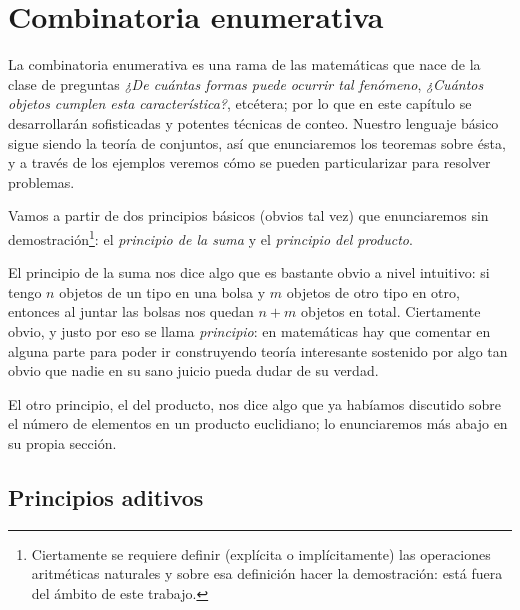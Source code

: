 \documentclass{book}
\theoremstyle{definition}
\begin{document}






\chapter{Combinatoria enumerativa}
\label{ch_combinatoriaEnumerativa}
La combinatoria enumerativa es una rama de las matemáticas que nace de la clase de preguntas \emph{¿De cuántas formas puede ocurrir tal fenómeno}, \emph{¿Cuántos objetos cumplen esta característica?}, etcétera; por lo que en este capítulo se desarrollarán  sofisticadas y potentes técnicas de conteo. Nuestro lenguaje básico sigue siendo la teoría de conjuntos, así que enunciaremos los teoremas sobre ésta, y a través de los ejemplos veremos cómo se pueden particularizar para resolver problemas.

Vamos a partir de dos principios básicos (obvios tal vez) que enunciaremos sin demostración\footnote{Ciertamente se requiere definir (explícita o implícitamente) las operaciones aritméticas naturales y sobre esa definición hacer la demostración: está fuera del ámbito de este trabajo.}: el \emph{principio de la suma} y el \emph{principio del producto}.

El principio de la suma nos dice algo que es bastante obvio a nivel intuitivo: si tengo $n$ objetos de un tipo en una bolsa y $m$ objetos de otro tipo en otro, entonces al juntar las bolsas nos quedan $n+m$ objetos en total.
Ciertamente obvio, y justo por eso se llama \emph{principio}: en matemáticas hay que comentar en alguna parte para poder ir construyendo teoría interesante sostenido por algo tan obvio que nadie en su sano juicio pueda dudar de su verdad.

El otro principio, el del producto, nos dice algo que ya habíamos discutido %
sobre el número de elementos en un producto euclidiano; lo enunciaremos más abajo en su propia sección.

\section{Principios aditivos}
\end{document}
